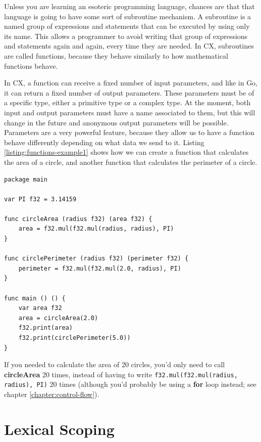 \documentclass[11pt,fleqn,openany]{book} %
\begin{document}
Unless you are learning an esoteric programming language, chances are that that language is going to have some sort of subroutine mechanism. A subroutine is a named group of expressions and statements that can be executed by using only its name. This allows a programmer to avoid writing that group of expressions and statements again and again, every time they are needed. In CX, subroutines are called functions, because they behave similarly to how mathematical functions behave.

In CX, a function can receive a fixed number of input parameters, and like in Go, it can return a fixed number of output parameters. These parameters must be of a specific type, either a primitive type or a complex type. At the moment, both input and output parameters must have a name associated to them, but this will change in the future and anonymous output parameters will be possible. Parameters are a very powerful feature, because they allow us to have a function behave differently depending on what data we send to it. Listing \ref{listing:functions-example1} shows how we can create a function that calculates the area of a circle, and another function that calculates the perimeter of a circle.

\begin{lstlisting}[caption={Determining area and perimeter of a circle using functions},captionpos=b,label={listing:functions-example1}]
package main

var PI f32 = 3.14159

func circleArea (radius f32) (area f32) {
	area = f32.mul(f32.mul(radius, radius), PI)
}

func circlePerimeter (radius f32) (perimeter f32) {
	perimeter = f32.mul(f32.mul(2.0, radius), PI)
}

func main () () {
	var area f32
	area = circleArea(2.0)
	f32.print(area)
	f32.print(circlePerimeter(5.0))
}
\end{lstlisting}

If you needed to calculate the area of 20 circles, you'd only need to call \textbf{circleArea} 20 times, instead of having to write \lstinline{f32.mul(f32.mul(radius, radius), PI)} 20 times (although you'd probably be using a \textbf{for} loop instead; see chapter \ref{chapter:control-flow}).

\section{Lexical Scoping}
\end{document}
